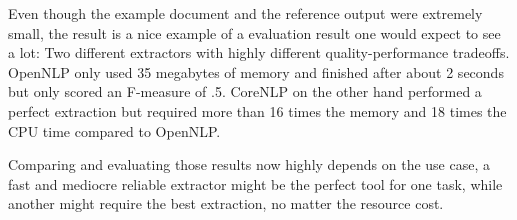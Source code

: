 Even though the example document and the reference output were extremely small, the result is a nice example of a evaluation result one would expect to see a lot: Two different extractors with highly different quality-performance tradeoffs. OpenNLP only used 35 megabytes of memory and finished after about 2 seconds but only scored an F-measure of .5. CoreNLP on the other hand performed a perfect extraction but required more than 16 times the memory and 18 times the CPU time compared to OpenNLP.

Comparing and evaluating those results now highly depends on the use case, a fast and mediocre reliable extractor might be the perfect tool for one task, while another might require the best extraction, no matter the resource cost.